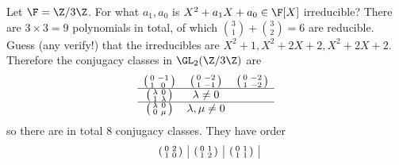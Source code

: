 \documentclass[a4paper]{article}
\theoremstyle{definition}
\begin{document}
\begin{eg}
  Let \(\F = \Z/3\Z\). For what \(a_1, a_0\) is \(X^2 + a_1X + a_0 \in \F[X]\) irreducible? There are \(3 \times 3 = 9\) polynomials in total, of which \(\binom{3}{1} + \binom{3}{2} = 6\) are reducible. Guess (any verify!) that the irreducibles are \(X^2 + 1, X^2 + 2X + 2, X^2 + 2X + 2\). Therefore the conjugacy classes in \(\GL_2(\Z/3\Z)\) are
  \[
    \begin{array}[h]{ccc}
      \begin{psmallmatrix}
        0 & -1 \\
        1 & 0
      \end{psmallmatrix}
          &
            \begin{psmallmatrix}
              0 & -2 \\
              1 & -1
            \end{psmallmatrix}
          &
            \begin{psmallmatrix}
              0 & -2 \\
              1 & -2
            \end{psmallmatrix}
      \\ \hline
      \begin{psmallmatrix}
        \lambda & 0 \\
        1 & \lambda
      \end{psmallmatrix}
          &
            \lambda \neq 0
      \\ \hline
      \begin{psmallmatrix}
        \lambda & 0 \\
        0 & \mu
      \end{psmallmatrix}
          &
            \lambda, \mu \neq 0
    \end{array}
  \]
  so there are in total \(8\) conjugacy classes. They have order
  \[
    \begin{array}[h]{c|c|c|c|c|c}
      \begin{psmallmatrix}
        0 & 2 \\
        1 & 0
      \end{psmallmatrix}
          &
            \begin{psmallmatrix}
              0 & 1 \\
              1 & 2
            \end{psmallmatrix}
          &
            \begin{psmallmatrix}
              0 & 1 \\
              1 & 1
            \end{psmallmatrix}

\end{array}\]
\end{eg}
\end{document}
